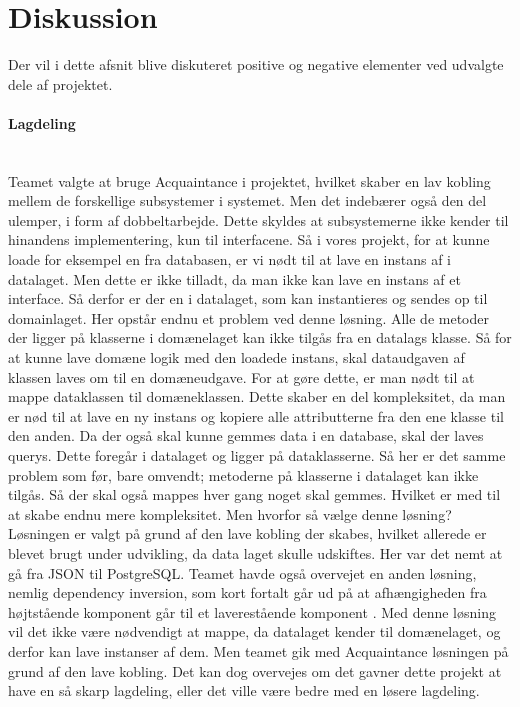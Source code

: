\documentclass[../main.tex]{subfiles}
\begin{document}
\section{Diskussion}
Der vil i dette afsnit blive diskuteret positive og negative elementer ved udvalgte dele af projektet.
\paragraph{Lagdeling}\mbox{} \\
Teamet valgte at bruge Acquaintance i projektet, hvilket skaber en lav kobling mellem de forskellige subsystemer i systemet. Men det indebærer også den del ulemper, i form af dobbeltarbejde. Dette skyldes at subsystemerne ikke kender til hinandens implementering, kun til interfacene. Så i vores projekt, for at kunne loade for eksempel en  fra databasen, er vi nødt til at lave en instans af  i datalaget. Men dette er ikke tilladt, da man ikke kan lave en instans af et interface. Så derfor er der en  i datalaget, som kan instantieres og sendes op til domainlaget.
Her opstår endnu et problem ved denne løsning. Alle de metoder der ligger på klasserne i domænelaget kan ikke tilgås fra en datalags klasse. Så for at kunne lave domæne logik med den loadede instans, skal dataudgaven af klassen laves om til en domæneudgave. For at gøre dette, er man nødt til at mappe dataklassen til domæneklassen. Dette skaber en del kompleksitet, da man er nød til at lave en ny instans og kopiere alle attributterne fra den ene klasse til den anden. Da der også skal kunne gemmes data i en database, skal der laves querys. Dette foregår i datalaget og ligger på dataklasserne. Så her er det samme problem som før, bare omvendt; metoderne på klasserne i datalaget kan ikke tilgås. Så der skal også mappes hver gang noget skal gemmes. Hvilket er med til at skabe endnu mere kompleksitet. Men hvorfor så vælge denne løsning? Løsningen er valgt på grund af den lave kobling der skabes, hvilket allerede er blevet brugt under udvikling, da data laget skulle udskiftes. Her var det nemt at gå fra JSON til PostgreSQL. 
Teamet havde også overvejet en anden løsning, nemlig dependency inversion, som kort fortalt går ud på at afhængigheden fra højtstående komponent går til et laverestående komponent \cite{dependency}. Med denne løsning vil det ikke være nødvendigt at mappe, da datalaget kender til domænelaget, og derfor kan lave instanser af dem. Men teamet gik med Acquaintance løsningen på grund af den lave kobling. Det kan dog overvejes om det gavner dette projekt at have en så skarp lagdeling, eller det ville være bedre med en løsere lagdeling. 
\end{document}
